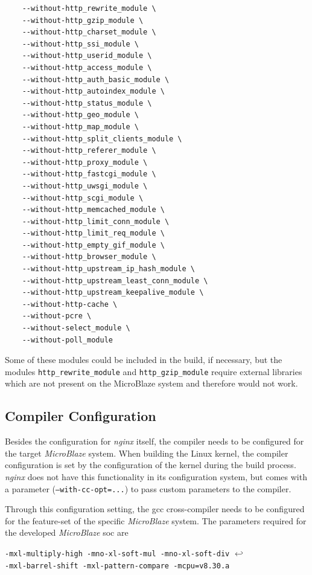 \begin{verbatim}
    --without-http_rewrite_module \
    --without-http_gzip_module \
    --without-http_charset_module \
    --without-http_ssi_module \
    --without-http_userid_module \
    --without-http_access_module \
    --without-http_auth_basic_module \
    --without-http_autoindex_module \
    --without-http_status_module \
    --without-http_geo_module \
    --without-http_map_module \
    --without-http_split_clients_module \
    --without-http_referer_module \
    --without-http_proxy_module \
    --without-http_fastcgi_module \
    --without-http_uwsgi_module \
    --without-http_scgi_module \
    --without-http_memcached_module \
    --without-http_limit_conn_module \
    --without-http_limit_req_module \
    --without-http_empty_gif_module \
    --without-http_browser_module \
    --without-http_upstream_ip_hash_module \
    --without-http_upstream_least_conn_module \
    --without-http_upstream_keepalive_module \
    --without-http-cache \
    --without-pcre \
    --without-select_module \
    --without-poll_module
\end{verbatim}

Some of these modules could be included in the build, if necessary, but the modules \texttt{http\_rewrite\_module} and \texttt{http\_gzip\_module} require external libraries which are not present on the MicroBlaze system and therefore would not work.
\\

\subsection{Compiler Configuration}

Besides the configuration for \textit{nginx} itself, the compiler needs to be configured for the target \textit{MicroBlaze} system. When building the Linux kernel, the compiler configuration is set by the configuration of the kernel during the build process. \textit{nginx} does not have this functionality in its configuration system, but comes with a parameter (\texttt{--with-cc-opt=...}) to pass custom parameters to the compiler.

Through this configuration setting, the \gls{gcc} cross-compiler needs to be configured for the feature-set of the specific \textit{MicroBlaze} system. The parameters required for the developed \textit{MicroBlaze} \gls{soc} are

\texttt{-mxl-multiply-high -mno-xl-soft-mul -mno-xl-soft-div} $\hookleftarrow$ \\
\texttt{-mxl-barrel-shift -mxl-pattern-compare -mcpu=v8.30.a}

